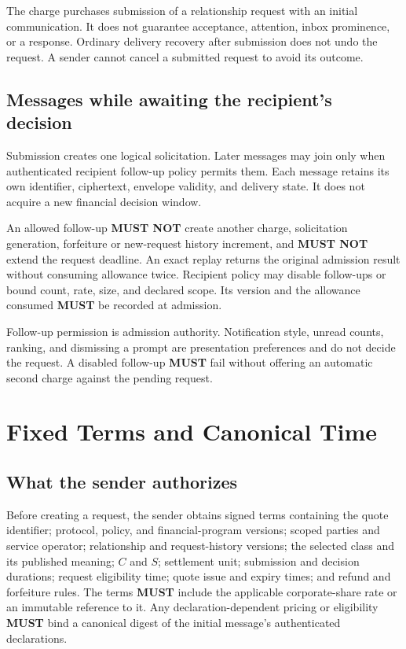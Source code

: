 \documentclass[11pt]{article}
\newcommand{\MUST}{\textbf{MUST}}
\newcommand{\MUSTNOT}{\textbf{MUST NOT}}
\begin{document}
The charge purchases submission of a relationship request with an initial
communication. It does not guarantee acceptance, attention, inbox prominence,
or a response. Ordinary delivery recovery after submission does not undo the
request. A sender cannot cancel a submitted request to avoid its outcome.

\subsection{Messages while awaiting the recipient's decision}

Submission creates one logical solicitation. Later messages may join only
when authenticated recipient follow-up policy permits them. Each message retains
its own identifier, ciphertext, envelope validity, and delivery state. It does
not acquire a new financial decision window.

An allowed follow-up \MUSTNOT{} create another charge, solicitation generation,
forfeiture or new-request history increment, and
\MUSTNOT{} extend the request deadline. An exact replay returns the original
admission result without consuming allowance twice. Recipient policy may disable
follow-ups or bound count, rate, size, and declared scope. Its version and the
allowance consumed \MUST{} be recorded at admission.

Follow-up permission is admission authority. Notification style, unread counts,
ranking, and dismissing a prompt are presentation preferences and do not decide
the request. A disabled follow-up \MUST{} fail without offering an automatic
second charge against the pending request.

\section{Fixed Terms and Canonical Time}

\subsection{What the sender authorizes}

Before creating a request, the sender obtains signed terms containing the quote
identifier; protocol, policy, and financial-program versions; scoped parties and
service operator; relationship and request-history versions; the selected class
and its published meaning; $C$ and $S$;
settlement unit; submission and decision durations; request eligibility time;
quote issue and expiry times; and refund and forfeiture rules. The terms
\MUST{} include the applicable corporate-share rate or an immutable reference
to it. Any declaration-dependent pricing or eligibility \MUST{} bind a canonical
digest of the initial message's authenticated declarations.
\end{document}
